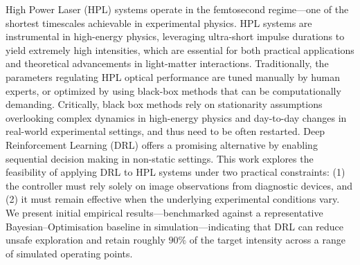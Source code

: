 High Power Laser (HPL) systems operate in the femtosecond regime—one of the shortest timescales achievable in experimental physics. 
HPL systems are instrumental in high-energy physics, leveraging ultra-short impulse durations to yield extremely high intensities, which are essential for both practical applications and theoretical advancements in light-matter interactions. Traditionally, the parameters regulating HPL optical performance are tuned manually by human experts, or optimized by using black-box methods that can be computationally demanding. Critically, black box methods rely on stationarity assumptions overlooking complex dynamics in high-energy physics and day-to-day changes in real-world experimental settings, and thus need to be often restarted. Deep Reinforcement Learning (DRL) offers a promising alternative by enabling sequential decision making in non-static settings. This work explores the 
feasibility of applying DRL to HPL systems under two practical constraints: (1) the controller must rely solely on image observations from diagnostic devices, and (2) it must remain effective when the underlying experimental conditions vary. We present initial empirical results—benchmarked against a representative Bayesian–Optimisation baseline in simulation—indicating that DRL can reduce unsafe exploration and retain roughly $90\%$ of the target intensity across a range of simulated operating points.